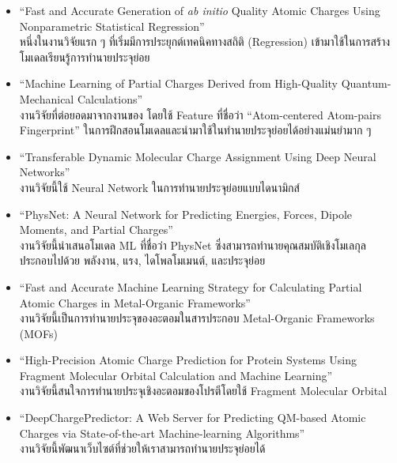 \begin{itemize}
    \item \enquote{Fast and Accurate Generation of \textit{ab initio} Quality Atomic Charges Using Nonparametric 
    Statistical Regression}\autocite{rai2013} \\ 
    หนึ่งในงานวิจัยแรก ๆ ที่เริ่มมีการประยุกต์เทคนิคทางสถิติ (Regression) เข้ามาใช้ในการสร้างโมเดลเรียนรู้การทำนายประจุย่อย
    
    \item \enquote{Machine Learning of Partial Charges Derived from High-Quality Quantum-Mechanical Calculations} 
    \autocite{bleiziffer2018} \\
    งานวิจัยที่ต่อยอดมาจากงานของ โดยใช้ Feature ที่ชื่อว่า \enquote{Atom-centered Atom-pairs Fingerprint}\autocite{carhart1985} 
    ในการฝึกสอนโมเดลและนำมาใช้ในทำนายประจุย่อยได้อย่างแม่นยำมาก ๆ
    
    \item \enquote{Transferable Dynamic Molecular Charge Assignment Using Deep Neural Networks}\autocite{nebgen2018} \\
    งานวิจัยนี้ใช้ Neural Network ในการทำนายประจุย่อยแบบไดนามิกส์
    
    \item \enquote{PhysNet: A Neural Network for Predicting Energies, Forces, Dipole Moments, and Partial Charges}
    \autocite{unke2019} \\
    งานวิจัยนี้นำเสนอโมเดล ML ที่ชื่อว่า PhysNet ซึ่งสามารถทำนายคุณสมบัติเชิงโมเลกุล ประกอบไปด้วย พลังงาน, แรง, ไดโพลโมเมนต์, 
    และประจุย่อย
    
    \item \enquote{Fast and Accurate Machine Learning Strategy for Calculating Partial Atomic Charges in 
    Metal-Organic Frameworks}\autocite{kancharlapalli2021} \\ 
    งานวิจัยนี้เป็นการทำนายประจุของอะตอมในสารประกอบ Metal-Organic Frameworks (MOFs)
    
    \item \enquote{High-Precision Atomic Charge Prediction for Protein Systems Using Fragment Molecular Orbital 
    Calculation and Machine Learning}\autocite{kato2020} \\ 
    งานวิจัยนี้สนใจการทำนายประจุเชิงอะตอมของโปรตีโดยใช้ Fragment Molecular Orbital
    
    \item \enquote{DeepChargePredictor: A Web Server for Predicting QM-based Atomic Charges via State-of-the-art 
    Machine-learning Algorithms}\autocite{wang2021} \\ 
    งานวิจัยนี้พัฒนาเว็บไซต์ที่ช่วยให้เราสามารถทำนายประจุย่อยได้
\end{itemize}

